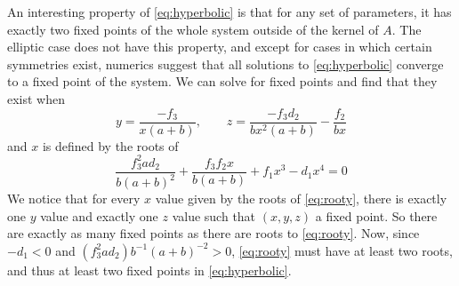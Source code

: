 \documentclass[11pt]{article}
\begin{document}
An interesting property of \eqref{eq:hyperbolic} is that for any set of parameters, it has exactly two fixed points of the whole system outside of the kernel of $A$. The elliptic case does not have this property, and except for cases in which certain symmetries exist, numerics suggest that all solutions to \eqref{eq:hyperbolic} converge to a fixed point of the system. We can solve for fixed points and find that they exist when $$y = \frac{-f_3}{x(a + b)}, \qquad z = \frac{-f_3d_2}{bx^2(a+b)} - \frac{f_2}{bx}$$and $x$ is defined by the roots of
\begin{equation}\label{eq:rooty}
    \frac{f_3^2ad_2}{b(a+b)^2} + \frac{f_3f_2x}{b(a+b)} + f_1x^3 - d_1x^4 = 0
\end{equation}
We notice that for every $x$ value given by the roots of \eqref{eq:rooty}, there is exactly one $y$ value and exactly one $z$ value such that $(x, y, z)$ a fixed point. So there are exactly as many fixed points as there are roots to \eqref{eq:rooty}. Now, since $-d_1 < 0$ and $(f_3^2ad_2)b^{-1}(a+b)^{-2} > 0$, \eqref{eq:rooty} must have at least two roots, and thus at least two fixed points in \eqref{eq:hyperbolic}.
\end{document}
